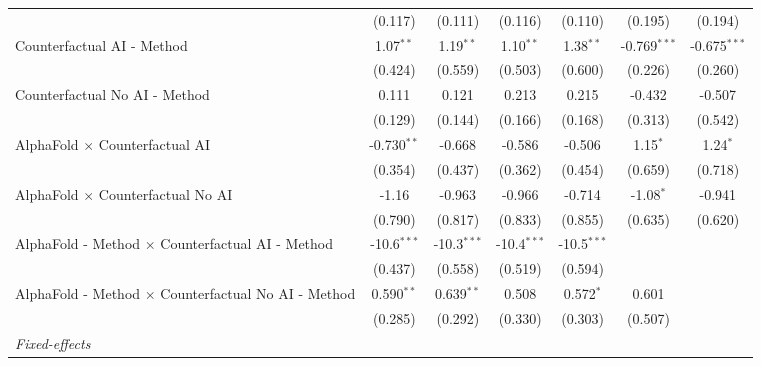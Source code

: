 \begin{tabular}{lcccccc}
                                                              & (0.117)       & (0.111)       & (0.116)       & (0.110)       & (0.195)        & (0.194)\\   
   Counterfactual AI - Method                                 & 1.07$^{**}$   & 1.19$^{**}$   & 1.10$^{**}$   & 1.38$^{**}$   & -0.769$^{***}$ & -0.675$^{***}$\\   
                                                              & (0.424)       & (0.559)       & (0.503)       & (0.600)       & (0.226)        & (0.260)\\   
   Counterfactual No AI - Method                              & 0.111         & 0.121         & 0.213         & 0.215         & -0.432         & -0.507\\   
                                                              & (0.129)       & (0.144)       & (0.166)       & (0.168)       & (0.313)        & (0.542)\\   
   AlphaFold $\times$ Counterfactual AI                       & -0.730$^{**}$ & -0.668        & -0.586        & -0.506        & 1.15$^{*}$     & 1.24$^{*}$\\   
                                                              & (0.354)       & (0.437)       & (0.362)       & (0.454)       & (0.659)        & (0.718)\\   
   AlphaFold $\times$ Counterfactual No AI                    & -1.16         & -0.963        & -0.966        & -0.714        & -1.08$^{*}$    & -0.941\\   
                                                              & (0.790)       & (0.817)       & (0.833)       & (0.855)       & (0.635)        & (0.620)\\   
   AlphaFold - Method $\times$ Counterfactual AI - Method     & -10.6$^{***}$ & -10.3$^{***}$ & -10.4$^{***}$ & -10.5$^{***}$ &                &   \\   
                                                              & (0.437)       & (0.558)       & (0.519)       & (0.594)       &                &   \\   
   AlphaFold - Method $\times$ Counterfactual No AI - Method  & 0.590$^{**}$  & 0.639$^{**}$  & 0.508         & 0.572$^{*}$   & 0.601          &   \\   
                                                              & (0.285)       & (0.292)       & (0.330)       & (0.303)       & (0.507)        &   \\   
   \midrule
   \emph{Fixed-effects}\\

\end{tabular}
